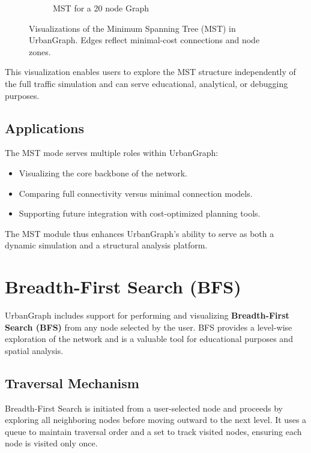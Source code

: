 \documentclass[12pt]{article}
\begin{document}
\begin{figure}[H]
\begin{subfigure}[b]{0.48\textwidth}
        \caption{MST for a 20 node Graph}
        \label{fig:mst-2}
    \end{subfigure}
    \caption{Visualizations of the Minimum Spanning Tree (MST) in UrbanGraph. Edges reflect minimal-cost connections and node zones.}
    \label{fig:mst-both}
\end{figure}


This visualization enables users to explore the MST structure independently of the full traffic simulation and can serve educational, analytical, or debugging purposes.

\subsection*{Applications}

The MST mode serves multiple roles within UrbanGraph:
\begin{itemize}
    \item Visualizing the core backbone of the network.
    \item Comparing full connectivity versus minimal connection models.
    \item Supporting future integration with cost-optimized planning tools.
\end{itemize}

The MST module thus enhances UrbanGraph’s ability to serve as both a dynamic simulation and a structural analysis platform.

\section{Breadth-First Search (BFS)}

UrbanGraph includes support for performing and visualizing \textbf{Breadth-First Search (BFS)} from any node selected by the user. BFS provides a level-wise exploration of the network and is a valuable tool for educational purposes and spatial analysis.

\subsection*{Traversal Mechanism}

Breadth-First Search is initiated from a user-selected node and proceeds by exploring all neighboring nodes before moving outward to the next level. It uses a queue to maintain traversal order and a set to track visited nodes, ensuring each node is visited only once.
\end{document}
